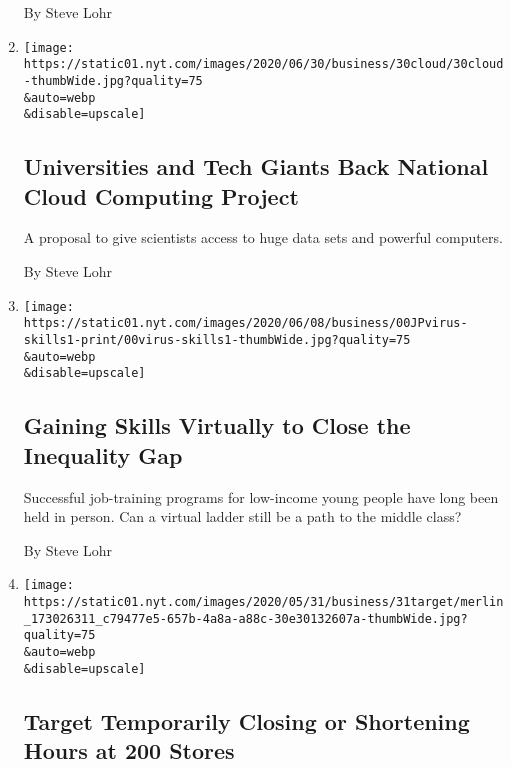 \begin{enumerate}
  By Steve Lohr
\item
  \href{/2020/06/30/technology/national-cloud-computing-project.html}{}

  \texttt{[image: https://static01.nyt.com/images/2020/06/30/business/30cloud/30cloud-thumbWide.jpg?quality=75\\\&auto=webp\\\&disable=upscale]}

  \hypertarget{universities-and-tech-giants-back-national-cloud-computing-project}{%
  \subsection{Universities and Tech Giants Back National Cloud Computing
  Project}\label{universities-and-tech-giants-back-national-cloud-computing-project}}

  A proposal to give scientists access to huge data sets and powerful
  computers.

  By Steve Lohr
\item
  \href{/2020/06/07/technology/virtual-skills-inequality-gap-virus.html}{}

  \texttt{[image: https://static01.nyt.com/images/2020/06/08/business/00JPvirus-skills1-print/00virus-skills1-thumbWide.jpg?quality=75\\\&auto=webp\\\&disable=upscale]}

  \hypertarget{gaining-skills-virtually-to-close-the-inequality-gap}{%
  \subsection{Gaining Skills Virtually to Close the Inequality
  Gap}\label{gaining-skills-virtually-to-close-the-inequality-gap}}

  Successful job-training programs for low-income young people have long
  been held in person. Can a virtual ladder still be a path to the
  middle class?

  By Steve Lohr
\item
  \href{/2020/05/31/business/target-closing-or-cutting-hours-George-Floyd.html}{}

  \texttt{[image: https://static01.nyt.com/images/2020/05/31/business/31target/merlin\_173026311\_c79477e5-657b-4a8a-a88c-30e30132607a-thumbWide.jpg?quality=75\\\&auto=webp\\\&disable=upscale]}

  \hypertarget{target-temporarily-closing-or-shortening-hours-at-200-stores}{%
  \subsection{Target Temporarily Closing or Shortening Hours at 200
  Stores}\label{target-temporarily-closing-or-shortening-hours-at-200-stores}}


\end{enumerate}
